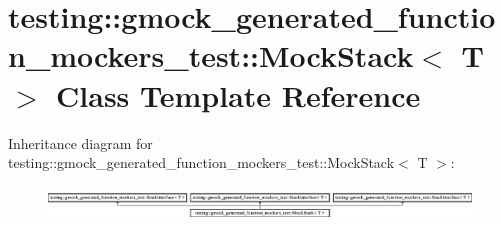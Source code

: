 \hypertarget{classtesting_1_1gmock__generated__function__mockers__test_1_1_mock_stack}{}\section{testing\+::gmock\+\_\+generated\+\_\+function\+\_\+mockers\+\_\+test\+::Mock\+Stack$<$ T $>$ Class Template Reference}
\label{classtesting_1_1gmock__generated__function__mockers__test_1_1_mock_stack}
Inheritance diagram for testing\+::gmock\+\_\+generated\+\_\+function\+\_\+mockers\+\_\+test\+::Mock\+Stack$<$ T $>$\+:\begin{figure}[H]
\begin{center}
\leavevmode
\includegraphics[height=0.906149cm]{d0/d5b/classtesting_1_1gmock__generated__function__mockers__test_1_1_mock_stack}
\end{center}
\end{figure}
